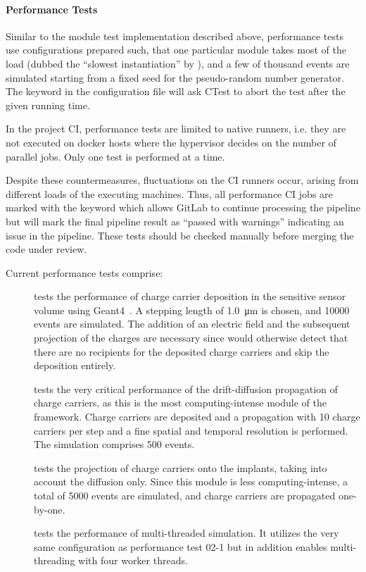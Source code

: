 \paragraph{Performance Tests}

Similar to the module test implementation described above, performance tests use configurations prepared such, that one particular module takes most of the load (dubbed the ``slowest instantiation'' by \apsq), and a few of thousand events are simulated starting from a fixed seed for the pseudo-random number generator.
The  keyword in the configuration file will ask CTest to abort the test after the given running time.

In the project CI, performance tests are limited to native runners, i.e. they are not executed on docker hosts where the hypervisor decides on the number of parallel jobs.
Only one test is performed at a time.

Despite these countermeasures, fluctuations on the CI runners occur, arising from different loads of the executing machines.
Thus, all performance CI jobs are marked with the  keyword which allows GitLab to continue processing the pipeline but will mark the final pipeline result as ``passed with warnings'' indicating an issue in the pipeline.
These tests should be checked manually before merging the code under review.

Current performance tests comprise:

\begin{description}
    \item[] tests the performance of charge carrier deposition in the sensitive sensor volume using Geant4~\cite{geant4}. A stepping length of \SI{1.0}{\um} is chosen, and \num{10000} events are simulated. The addition of an electric field and the subsequent projection of the charges are necessary since \apsq would otherwise detect that there are no recipients for the deposited charge carriers and skip the deposition entirely.
    \item[] tests the very critical performance of the drift-diffusion propagation of charge carriers, as this is the most computing-intense module of the framework. Charge carriers are deposited and a propagation with 10 charge carriers per step and a fine spatial and temporal resolution is performed. The simulation comprises \num{500} events.
    \item[] tests the projection of charge carriers onto the implants, taking into account the diffusion only. Since this module is less computing-intense, a total of \num{5000} events are simulated, and charge carriers are propagated one-by-one.
    \item[] tests the performance of multi-threaded simulation. It utilizes the very same configuration as performance test 02-1 but in addition enables multi-threading with four worker threads.
\end{description}
